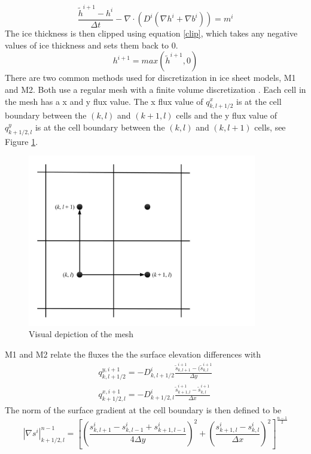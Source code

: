 \documentclass{article}
\begin{document}
\begin{equation} \label{timestep}
\frac{\tilde{h}^{i+1}-h^i}{\Delta t} - \nabla \cdot (D^i (\nabla h^{i} + \nabla b^{i})) = m^i
\end{equation}
The ice thickness is then clipped using equation \ref{clip}, which takes any negative values of ice thickness and sets them back to 0. 
\begin{equation}\label{clip}
h^{i+1}=max(\tilde{h}^{i+1},0)
\end{equation}
There are two common methods used for discretization in ice sheet models, M1 and M2. Both use a regular mesh with a finite volume discretization \cite{Jarosch2013,Hindmarsh1996,Huybrechts1996}.  Each cell in the mesh has a x and y flux value. The x flux value of $q^x_{k, l+1/2}$  is at the cell boundary between the $(k,l)$ and $(k+1,l) $ cells and the y flux value of $q^y_{k+1/2, l}$ is at the cell boundary between the $(k,l)$ and $(k,l+1)$ cells, see Figure \ref{fig:Grid}. 
\begin{figure}[H]
    \centering
    \includegraphics[width=10cm]{Grid.jpg}
    \caption{Visual depiction of the mesh}
    \label{fig:Grid}
\end{figure}
M1 and M2 relate the fluxes the the surface elevation differences with
\begin{subequations}
\begin{gather}
    q^{y, i+1}_{k, l+1/2}=-D^i_{k, l+1/2}\frac{\tilde{s}^{i+1}_{k, l+1}-(\tilde{s}^{i+1}_{k, l}}{\Delta y} \\
    q^{x, i+1}_{k+1/2, l}=-D^i_{k+1/2, l}\frac{\tilde{s}^{i+1}_{k+1, l}-\tilde{s}^{i+1}_{k, l}}{\Delta x}
\end{gather}
\end{subequations}
The norm of the surface gradient at the cell boundary is then defined to be 
\begin{equation}
    |\nabla s ^i|^{n-1}_{k+1/2,l} = \left[\left( \frac{s^i_{k,l+1}-s^i_{k,l-1}+s^i_{k+1,l-1}}{4\Delta y}\right)^2+\left( \frac{s^i_{k+1,l}-s^i_{k,l}}{\Delta x}\right)^2 \right]^{\frac{n-1}{2}}
\end{equation}
\end{document}
